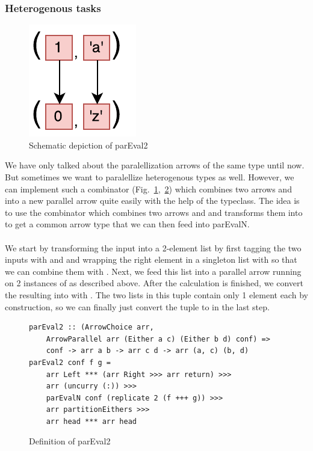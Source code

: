 \subsubsection{Heterogenous tasks}
\begin{figure}[h]
	\includegraphics[scale=0.7]{images/parEval2}
	\caption{Schematic depiction of parEval2}
	\label{fig:parEval2Img}
\end{figure}
We have only talked about the paralellization arrows of the same type until now. But sometimes we want to paralellize heterogenous types as well. However, we can implement such a  combinator (Fig.~\ref{fig:parEval2Img},~\ref{fig:parEval2}) which combines two arrows  and  into a new parallel arrow  quite easily with the help of the  typeclass. The idea is to use the \code{+++} combinator which combines two arrows  and  and transforms them into  to get a common arrow type that we can then feed into parEvalN.
\\\\
We start by transforming the  input into a 2-element list \code{[Either a c]} by first tagging the two inputs with  and  and wrapping the right element in a singleton list with  so that we can combine them with . Next, we feed this list into a parallel arrow running on 2 instances of  as described above. After the calculation is finished, we convert the resulting \code{[Either b d]} into \code{([b], [d])} with . The two lists in this tuple contain only 1 element each by construction, so we can finally just convert the tuple to  in the last step.
\begin{figure}[h]
\begin{lstlisting}[frame=htrbl]
parEval2 :: (ArrowChoice arr,
	ArrowParallel arr (Either a c) (Either b d) conf) =>
	conf -> arr a b -> arr c d -> arr (a, c) (b, d)
parEval2 conf f g = 
	arr Left *** (arr Right >>> arr return) >>>
	arr (uncurry (:)) >>>
	parEvalN conf (replicate 2 (f +++ g)) >>>
	arr partitionEithers >>>
	arr head *** arr head
\end{lstlisting}
	\caption{Definition of parEval2}
	\label{fig:parEval2}
\end{figure}


